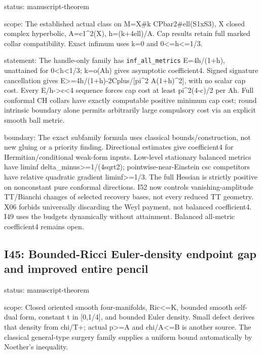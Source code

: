 \documentclass[
  10pt,
]{article}
\begin{document}
status: manuscript-theorem

scope: The established actual class on M=X\#k CPbar2\#ell(S1xS3), X
closed complex hyperbolic, A=c1\^{}2(X), h=(k+4ell)/A. Cap results
retain full marked collar compatibility. Exact infimum uses k=0 and
0\textless=h\textless=1/3.

statement: The handle-only family has \nolinkurl{inf_all_metrics} E=4h/(1+h),
unattained for 0\textless h\textless1/3; k=o(Ah) gives asymptotic
coefficient4. Signed signature cancellation gives
E\textgreater=4h/(1+h)-2Cplus/{[}pi\^{}2 A(1+h)\^{}2{]}, with no scalar
cap cost. Every E/h-\textgreater c\textless4 sequence forces cap cost at
least pi\^{}2(4-c)/2 per Ah. Full conformal CH collars have exactly
computable positive minimum cap cost; round intrinsic boundary alone
permits arbitrarily large compulsory cost via an explicit smooth ball
metric.

boundary: The exact subfamily formula uses classical
bounds/construction, not new gluing or a priority finding. Directional
estimates give coefficient4 for Hermitian/conditional weak-form inputs.
Low-level stationary balanced metrics have liminf
delta\_minus\textgreater=1/(4sqrt2); pointwise-near-Einstein csc
competitors have relative quadratic gradient liminf\textgreater=1/3. The
full Hessian is strictly positive on nonconstant pure conformal
directions. I52 now controls vanishing-amplitude TT/Bianchi changes of
selected recovery bases, not every reduced TT geometry. X06 forbids
universally discarding the Weyl payment, not balanced coefficient4. I49
uses the budgets dynamically without attainment. Balanced all-metric
coefficient4 remains open.

\hypertarget{i45-bounded-ricci-euler-density-endpoint-gap-and-improved-entire-pencil}{%
\subsection{I45: Bounded-Ricci Euler-density endpoint gap and improved
entire
pencil}\label{i45-bounded-ricci-euler-density-endpoint-gap-and-improved-entire-pencil}}

status: manuscript-theorem

scope: Closed oriented smooth four-manifolds,
\textbar Ric\textbar\textless=K, bounded smooth self-dual form, constant
t in {[}0,1/4{]}, and bounded Euler density. Small defect derives that
density from chi/T+; actual p\textgreater=A and chi/A\textless=B is
another source. The classical general-type surgery family supplies a
uniform bound automatically by Noether's inequality.
\end{document}
